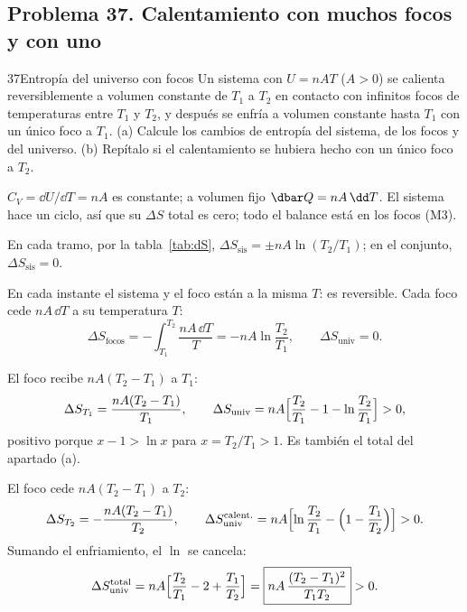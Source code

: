

\subsection{Problema 37. Calentamiento con muchos focos y con uno}
\begin{problema}{37}{Entropía del universo con focos}
Un sistema con $U=nAT$ ($A>0$) se calienta reversiblemente a volumen constante de $T_1$ a $T_2$ en contacto con
infinitos focos de temperaturas entre $T_1$ y $T_2$, y después se enfría a volumen constante hasta $T_1$ con un único
foco a $T_1$. (a) Calcule los cambios de entropía del sistema, de los focos y del universo. (b) Repítalo si el
calentamiento se hubiera hecho con un único foco a $T_2$.
\end{problema}

\begin{resolucion}
\idea $C_V=\dd U/\dd T=nA$ es constante; a volumen fijo $\dbar Q=nA\,\dd T$. El sistema hace un ciclo, así que su
$\Delta S$ total es cero; todo el balance está en los focos (M3).

 En cada tramo, por la tabla~\ref{tab:dS}, $\Delta S_{\mathrm{sis}}=\pm nA\ln(T_2/T_1)$; en el
conjunto, $\Delta S_{\mathrm{sis}}=0$.

 En cada instante el sistema y el foco están a la misma $T$: es
reversible. Cada foco cede $nA\,\dd T$ a su temperatura $T$:
\[
  \Delta S_{\mathrm{focos}}=-\int_{T_1}^{T_2}\frac{nA\,\dd T}{T}=-nA\ln\frac{T_2}{T_1},\qquad \Delta S_{\mathrm{univ}}=0 .
\]

 El foco recibe $nA(T_2-T_1)$ a $T_1$:
\[
  \Delta S_{T_1}=\frac{nA(T_2-T_1)}{T_1},\qquad
  \Delta S_{\mathrm{univ}}=nA\Bigl[\frac{T_2}{T_1}-1-\ln\frac{T_2}{T_1}\Bigr]>0,
\]
positivo porque $x-1>\ln x$ para $x=T_2/T_1>1$. Es también el total del apartado (a).

 El foco cede $nA(T_2-T_1)$ a $T_2$:
\[
  \Delta S_{T_2}=-\frac{nA(T_2-T_1)}{T_2},\qquad
  \Delta S_{\mathrm{univ}}^{\mathrm{calent.}}=nA\Bigl[\ln\frac{T_2}{T_1}-\Bigl(1-\frac{T_1}{T_2}\Bigr)\Bigr]>0 .
\]
Sumando el enfriamiento, el $\ln$ se cancela:
\[
  \Delta S_{\mathrm{univ}}^{\mathrm{total}}=nA\Bigl[\frac{T_2}{T_1}-2+\frac{T_1}{T_2}\Bigr]=\boxed{nA\,\frac{(T_2-T_1)^2}{T_1T_2}}>0 .
\]
\end{resolucion}

